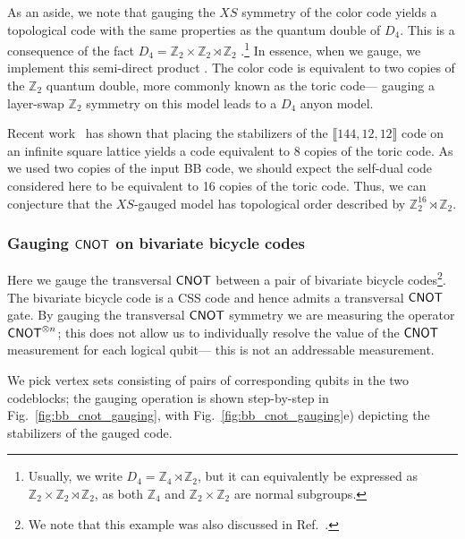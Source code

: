 \documentclass[11pt]{article}
\begin{document}
As an aside, we note that gauging the $XS$ symmetry of the color code yields a topological code with the same properties as the quantum double of $D_4$. This is a consequence of the fact $D_4 = \mathbb{Z}_2 \times \mathbb{Z}_2 \rtimes \mathbb{Z}_2$ .\footnote{Usually, we write $D_4 = \mathbb{Z}_4 \rtimes \mathbb{Z}_2$, but it can equivalently be expressed as $\mathbb{Z}_2 \times \mathbb{Z}_2 \rtimes \mathbb{Z}_2$, as both $\mathbb{Z}_4$ and $\mathbb{Z}_2 \times \mathbb{Z}_2$ are normal subgroups.} In essence, when we gauge, we implement this semi-direct product \cite{Tantivasadakarn_2023}. The color code is equivalent to two copies of the $\mathbb{Z}_2$ quantum double, more commonly known as the toric code--- gauging a layer-swap $\mathbb{Z}_2$ symmetry on this model leads to a $D_4$ anyon model. 

Recent work~\cite{LiangChen2025Bivariate} has shown that placing the stabilizers of the $\llbracket 144, 12, 12\rrbracket$ code on an infinite square lattice yields a code equivalent to 8 copies of the toric code. As we used two copies of the input BB code, we should expect the self-dual code considered here to be equivalent to 16 copies of the toric code. Thus, we can conjecture that the $XS$-gauged model has topological order described by $\mathbb{Z}_2^{16} \rtimes \mathbb{Z}_2$.

\subsubsection{Gauging \texorpdfstring{$\mathsf{CNOT}$}{CNOT} on bivariate bicycle codes}
Here we gauge the transversal $\mathsf{CNOT}$ between a pair of bivariate bicycle codes\footnote{We note that this example was also discussed in Ref.~\cite{christos2026nonabelianquantumlowdensityparity}.}. The bivariate bicycle code is a CSS code and hence admits a transversal $\mathsf{CNOT}$ gate.  By gauging the transversal $\mathsf{CNOT}$ symmetry we are measuring the operator $\mathsf{CNOT}^{\otimes n}$; this does not allow us to individually resolve the value of the $\mathsf{CNOT}$ measurement for each logical qubit--- this is not an addressable measurement.

We pick vertex sets consisting of pairs of corresponding qubits in the two codeblocks; the gauging operation is shown step-by-step in Fig.~\ref{fig:bb_cnot_gauging}, with Fig.~\ref{fig:bb_cnot_gauging}e) depicting the stabilizers of the gauged code.
\end{document}
